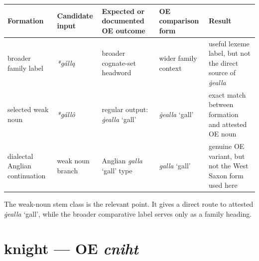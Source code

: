 \documentclass[
  british,
  a4paper,
  openany]{book}
\newcounter{none} %
\providecommand{\texorpdfstring}[2]{#1}
\begin{document}
{\def\LTcaptype{none} %
\begin{longtable}[]{@{}
  >{\raggedright\arraybackslash}p{}
  >{\raggedright\arraybackslash}p{}
  >{\raggedright\arraybackslash}p{}
  >{\raggedright\arraybackslash}p{}
  >{\raggedright\arraybackslash}p{}@{}}
\toprule\noalign{}
\begin{minipage}[b]{\linewidth}\raggedright
Formation
\end{minipage} & \begin{minipage}[b]{\linewidth}\raggedright
Candidate input
\end{minipage} & \begin{minipage}[b]{\linewidth}\raggedright
Expected or documented OE outcome
\end{minipage} & \begin{minipage}[b]{\linewidth}\raggedright
OE comparison form
\end{minipage} & \begin{minipage}[b]{\linewidth}\raggedright
Result
\end{minipage} \\
\midrule\noalign{}
\endhead
\bottomrule\noalign{}
\endlastfoot
broader family label & {\emph{*gállą}} & broader cognate-set headword &
wider family context & useful lexeme label, but not the direct source of
\emph{ġealla} \\
selected weak noun & {\emph{*gállô}} & regular output: {\emph{ġealla}}
`gall' & {\emph{ġealla}} `gall' & exact match between formation and
attested OE noun \\
dialectal Anglian continuation & weak noun branch & Anglian
{\emph{galla}} `gall' type & {\emph{galla}} `gall' & genuine OE variant,
but not the West Saxon form used here \\
\end{longtable}
}

The weak-noun stem class is the relevant point. It gives a direct route
to attested \emph{ġealla} `gall', while the broader comparative label
serves only as a family heading.

\section{\texorpdfstring{knight --- OE
\emph{cniht}}{knight --- OE cniht}}\label{knight-oe-cniht}
\end{document}
